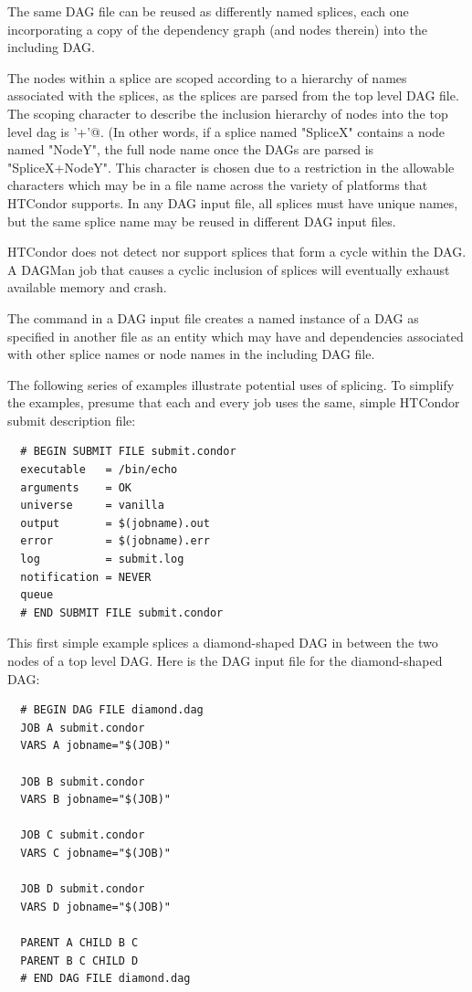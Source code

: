 The same DAG file can be reused as differently named splices,
each one
incorporating a copy of the dependency graph (and nodes therein) into the
including DAG. 

The nodes within a splice are scoped according to
a hierarchy of names associated with the splices,
as the splices are parsed from the top level DAG file.
The scoping character to describe the
inclusion hierarchy of nodes into the top level dag is 
\verb@'+'@.  (In other words, if a splice named "SpliceX" contains
a node named "NodeY", the full node name once the DAGs are parsed
is "SpliceX+NodeY".
This character is chosen due
to a restriction in the allowable characters which may be in a file name
across the variety of platforms that HTCondor supports.
In any DAG input file, all splices must have unique names,
but the same splice name may be reused in different DAG input files.

HTCondor does not detect nor support splices that form a cycle
within the DAG.
A DAGMan job that causes a cyclic inclusion of splices will
eventually exhaust available memory and crash.

The  command in a DAG input file
creates a named instance of a DAG as specified
in another file as an entity which may have  and 
dependencies associated with other splice names or node names in the
including DAG file.

The following series of examples illustrate potential uses of
splicing. To simplify the examples,
presume that each and every job uses the same,
simple HTCondor submit description file:

\begin{verbatim}
  # BEGIN SUBMIT FILE submit.condor
  executable   = /bin/echo
  arguments    = OK
  universe     = vanilla
  output       = $(jobname).out
  error        = $(jobname).err
  log          = submit.log
  notification = NEVER
  queue
  # END SUBMIT FILE submit.condor
\end{verbatim}

This first simple example splices a diamond-shaped DAG in
between the two nodes of a top level DAG.
Here is the DAG input file for the diamond-shaped DAG:

\begin{verbatim}
  # BEGIN DAG FILE diamond.dag
  JOB A submit.condor
  VARS A jobname="$(JOB)"

  JOB B submit.condor
  VARS B jobname="$(JOB)"

  JOB C submit.condor
  VARS C jobname="$(JOB)"

  JOB D submit.condor
  VARS D jobname="$(JOB)"

  PARENT A CHILD B C
  PARENT B C CHILD D
  # END DAG FILE diamond.dag
\end{verbatim}


